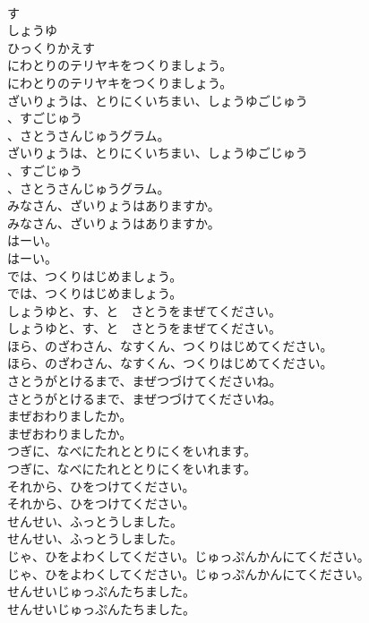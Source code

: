 \documentclass[8pt]{extreport}
\begin{document}
\begin{CJK}{UTF8}{min}
\\	す
\\	しょうゆ
\\	ひっくりかえす
\\	にわとりのテリヤキをつくりましょう。
\\	にわとりのテリヤキをつくりましょう。
\\	ざいりょうは、とりにくいちまい、しょうゆごじゅう
\\	、すごじゅう
\\	、さとうさんじゅうグラム。
\\	ざいりょうは、とりにくいちまい、しょうゆごじゅう
\\	、すごじゅう
\\	、さとうさんじゅうグラム。
\\	みなさん、ざいりょうはありますか。
\\	みなさん、ざいりょうはありますか。
\\	はーい。
\\	はーい。
\\	では、つくりはじめましょう。
\\	では、つくりはじめましょう。
\\	しょうゆと、す、と　さとうをまぜてください。
\\	しょうゆと、す、と　さとうをまぜてください。
\\	ほら、のざわさん、なすくん、つくりはじめてください。
\\	ほら、のざわさん、なすくん、つくりはじめてください。
\\	さとうがとけるまで、まぜつづけてくださいね。
\\	さとうがとけるまで、まぜつづけてくださいね。
\\	まぜおわりましたか。
\\	まぜおわりましたか。
\\	つぎに、なべにたれととりにくをいれます。
\\	つぎに、なべにたれととりにくをいれます。
\\	それから、ひをつけてください。
\\	それから、ひをつけてください。
\\	せんせい、ふっとうしました。
\\	せんせい、ふっとうしました。
\\	じゃ、ひをよわくしてください。じゅっぷんかんにてください。
\\	じゃ、ひをよわくしてください。じゅっぷんかんにてください。
\\	せんせいじゅっぷんたちました。
\\	せんせいじゅっぷんたちました。

\end{CJK}
\end{document}
